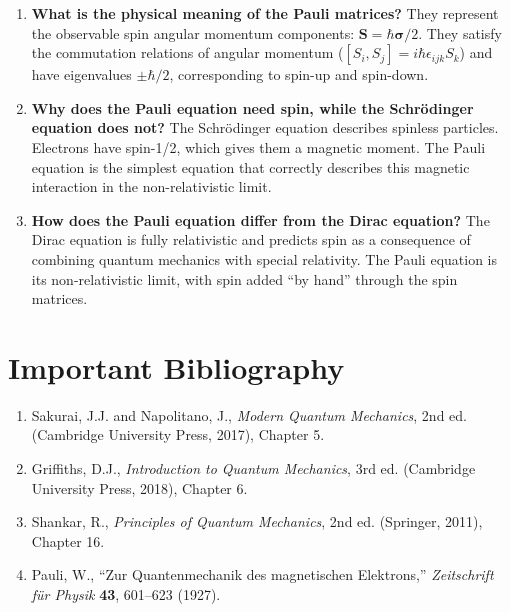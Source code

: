 \begin{enumerate}
\item \textbf{What is the physical meaning of the Pauli matrices?}
They represent the observable spin angular momentum components: $\mathbf{S} = \hbar\boldsymbol{\sigma}/2$. They satisfy the commutation relations of angular momentum ($[S_{i}, S_{j}] = i\hbar\epsilon_{ijk}S_{k}$) and have eigenvalues $\pm\hbar/2$, corresponding to spin-up and spin-down.

\item \textbf{Why does the Pauli equation need spin, while the Schrödinger equation does not?}
The Schrödinger equation describes spinless particles. Electrons have spin-1/2, which gives them a magnetic moment. The Pauli equation is the simplest equation that correctly describes this magnetic interaction in the non-relativistic limit.

\item \textbf{How does the Pauli equation differ from the Dirac equation?}
The Dirac equation is fully relativistic and predicts spin as a consequence of combining quantum mechanics with special relativity. The Pauli equation is its non-relativistic limit, with spin added ``by hand'' through the spin matrices.
\end{enumerate}
\section*{Important Bibliography}

\begin{enumerate}
\item Sakurai, J.J. and Napolitano, J., \textit{Modern Quantum Mechanics}, 2nd ed. (Cambridge University Press, 2017), Chapter 5.
\item Griffiths, D.J., \textit{Introduction to Quantum Mechanics}, 3rd ed. (Cambridge University Press, 2018), Chapter 6.
\item Shankar, R., \textit{Principles of Quantum Mechanics}, 2nd ed. (Springer, 2011), Chapter 16.
\item Pauli, W., ``Zur Quantenmechanik des magnetischen Elektrons,'' \textit{Zeitschrift f\"ur Physik} \textbf{43}, 601--623 (1927).
\end{enumerate}

